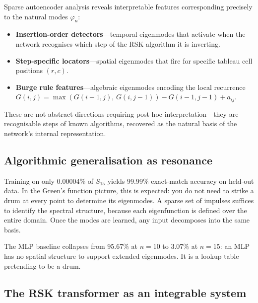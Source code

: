 \documentclass[11pt,a4paper]{article}
\begin{document}
Sparse autoencoder analysis reveals interpretable features corresponding
precisely to the natural modes $\varphi_n$:

\begin{itemize}[leftmargin=*]
  \item \textbf{Insertion-order detectors}---temporal eigenmodes that activate
    when the network recognises which step of the RSK algorithm it is inverting.
  \item \textbf{Step-specific locators}---spatial eigenmodes that fire for
    specific tableau cell positions $(r, c)$.
  \item \textbf{Burge rule features}---algebraic eigenmodes encoding the local
    recurrence $G(i,j) = \max(G(i{-}1,j),\, G(i,j{-}1)) - G(i{-}1,j{-}1) + a_{ij}$.
\end{itemize}

These are not abstract directions requiring post hoc interpretation---they are
recognisable steps of known algorithms, recovered as the natural basis of the
network's internal representation.

\subsection{Algorithmic generalisation as resonance}

Training on only 0.00004\% of $S_{15}$ yields 99.99\% exact-match accuracy on
held-out data. In the Green's function picture, this is expected: you do not
need to strike a drum at every point to determine its eigenmodes. A sparse set
of impulses suffices to identify the spectral structure, because each
eigenfunction is defined over the entire domain. Once the modes are
learned, any input decomposes into the same basis.

The MLP baseline collapses from 95.67\% at $n = 10$ to 3.07\% at $n = 15$:
an MLP has no spatial structure to support extended eigenmodes. It is a lookup
table pretending to be a drum.

\subsection{The RSK transformer as an integrable system}
\end{document}
